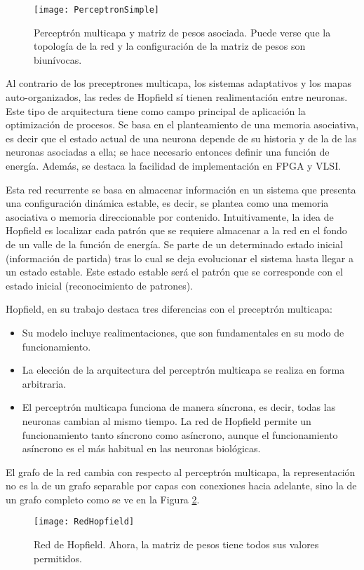 \begin{figure}
	\centering
	\texttt{[image: PerceptronSimple]}\\
	\caption{Perceptrón multicapa y matriz de pesos asociada. Puede verse que la topología de la red y la configuración de la matriz de pesos son biunívocas.}\label{fig:PerceptronSimple}
\end{figure}

Al contrario de los preceptrones multicapa, los sistemas adaptativos y los mapas auto-organizados, las redes de Hopfield sí tienen realimentación entre neuronas.
Este tipo de arquitectura tiene como campo principal de aplicación la optimización de procesos.
Se basa en el planteamiento de una memoria asociativa, es decir que el estado actual de una neurona depende de su historia y de la de las neuronas asociadas a ella; se hace necesario entonces definir una función de energía.
Además, se destaca la facilidad de implementación en FPGA y VLSI.

Esta red recurrente se basa en almacenar información en un sistema que presenta una configuración dinámica estable, es decir, se plantea como una memoria asociativa o memoria direccionable por contenido.
Intuitivamente, la idea de Hopfield es localizar cada patrón que se requiere almacenar a la red en el fondo de un valle de la función de energía.
Se parte de un determinado estado inicial (información de partida) tras lo cual se deja evolucionar el sistema hasta llegar a un estado estable.
Este estado estable será el patrón que se corresponde con el estado inicial (reconocimiento de patrones).

Hopfield, en su trabajo destaca tres diferencias con el preceptrón multicapa:
\begin{itemize}
		\item Su modelo incluye realimentaciones, que son fundamentales en su modo de funcionamiento.
		\item La elección de la arquitectura del perceptrón multicapa se realiza en forma arbitraria.
		\item El perceptrón multicapa funciona de manera síncrona, es decir, todas las neuronas cambian al mismo tiempo. La red de Hopfield permite un funcionamiento tanto síncrono como asíncrono, aunque el funcionamiento asíncrono es el más habitual en las neuronas biológicas.
\end{itemize}

El grafo de la red cambia con respecto al perceptrón multicapa, la representación no es la de un grafo separable por capas con conexiones hacia adelante, sino la de un grafo completo como se ve en la Figura \ref{fig:RedHopfield}.
\begin{figure}
	\centering
	\texttt{[image: RedHopfield]}\\
	\caption{Red de Hopfield. Ahora, la matriz de pesos tiene todos sus valores permitidos.}\label{fig:RedHopfield}
\end{figure}

